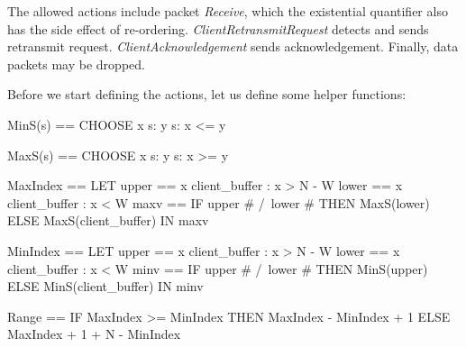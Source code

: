 The allowed actions include packet \textit{Receive}, which the existential
quantifier also has the side effect of re-ordering.
\textit{ClientRetransmitRequest} detects and sends retransmit request.
\textit{ClientAcknowledgement} sends acknowledgement. Finally, data packets may
be dropped.\newline

Before we start defining the actions, let us define some helper functions:\newline
\begin{tla}
MinS(s) == 
    CHOOSE x \in s: \A y \in s: x <= y

MaxS(s) == 
    CHOOSE x \in s: \A y \in s: x >= y

MaxIndex == 
    LET 
        upper == {x \in client_buffer : x > N - W}
        lower == {x \in client_buffer : x < W}
        maxv == IF upper # {} /\ lower # {} 
                THEN 
                    MaxS(lower)
                ELSE 
                    MaxS(client_buffer)
    IN 
        maxv

MinIndex == 
    LET 
        upper == {x \in client_buffer : x > N - W}
        lower == {x \in client_buffer : x < W}
        minv == IF upper # {} /\ lower # {} 
                THEN 
                    MinS(upper)
                ELSE 
                    MinS(client_buffer)
    IN 
        minv

Range == 
    IF MaxIndex >= MinIndex
    THEN
        MaxIndex - MinIndex + 1
    ELSE 
        MaxIndex + 1 + N - MinIndex
\end{tla}
\begin{tlatex}
%
%
\@pvspace{8.0pt}%
%
%
\@pvspace{8.0pt}%
%
%
%
%
%
%
%
%
\@pvspace{8.0pt}%
%
%
%
%
%
%
%
%
\@pvspace{8.0pt}%
%
%
%
%
%
%
\end{tlatex}
\newline

